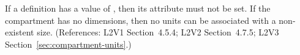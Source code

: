 If a \Compartment definition has a  value
of , then its  attribute must not be set. If the
compartment has no dimensions, then no units can be associated
with a non-existent size.  (References: L2V1 Section~4.5.4;
L2V2 Section~4.7.5; L2V3 Section~\ref{sec:compartment-units}.)
